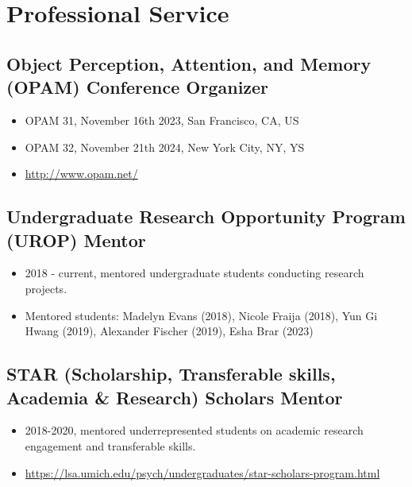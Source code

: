 \documentclass[11pt,a4paper,]{awesome-cv}
\providecommand{\tightlist}{%
	\setlength{\itemsep}{0pt}\setlength{\parskip}{0pt}}
\begin{document}
\hypertarget{professional-service}{%
\section{Professional Service}\label{professional-service}}

\hypertarget{object-perception-attention-and-memory-opam-conference-organizer}{%
\subsection{Object Perception, Attention, and Memory (OPAM) Conference
Organizer}\label{object-perception-attention-and-memory-opam-conference-organizer}}

\begin{itemize}
\tightlist
\item
  OPAM 31, November 16th 2023, San Francisco, CA, US
\item
  OPAM 32, November 21th 2024, New York City, NY, YS
\item
  \url{http://www.opam.net/}
\end{itemize}

\hypertarget{undergraduate-research-opportunity-program-urop-mentor}{%
\subsection{Undergraduate Research Opportunity Program (UROP)
Mentor}\label{undergraduate-research-opportunity-program-urop-mentor}}

\begin{itemize}
\tightlist
\item
  2018 - current, mentored undergraduate students conducting research
  projects.
\item
  Mentored students: Madelyn Evans (2018), Nicole Fraija (2018), Yun Gi
  Hwang (2019), Alexander Fischer (2019), Esha Brar (2023)
\end{itemize}

\hypertarget{star-scholarship-transferable-skills-academia-research-scholars-mentor}{%
\subsection{STAR (Scholarship, Transferable skills, Academia \&
Research) Scholars
Mentor}\label{star-scholarship-transferable-skills-academia-research-scholars-mentor}}

\begin{itemize}
\tightlist
\item
  2018-2020, mentored underrepresented students on academic research
  engagement and transferable skills.
\item
  \url{https://lsa.umich.edu/psych/undergraduates/star-scholars-program.html}
\end{itemize}
\end{document}
